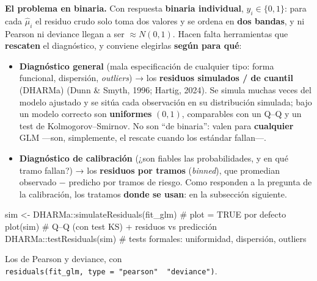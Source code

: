 \documentclass[
  letterpaper,
  DIV=11,
  numbers=noendperiod]{scrartcl}
\newenvironment{Shaded}{\begin{snugshade}}{\end{snugshade}}
\newcommand{\CommentTok}[1]{\textcolor[rgb]{0.37,0.37,0.37}{#1}}
\newcommand{\FunctionTok}[1]{\textcolor[rgb]{0.28,0.35,0.67}{#1}}
\newcommand{\NormalTok}[1]{\textcolor[rgb]{0.00,0.23,0.31}{#1}}
\newcommand{\OtherTok}[1]{\textcolor[rgb]{0.00,0.23,0.31}{#1}}
\newcommand{\SpecialCharTok}[1]{\textcolor[rgb]{0.37,0.37,0.37}{#1}}
\providecommand{\tightlist}{%
  \setlength{\itemsep}{0pt}\setlength{\parskip}{0pt}}\usepackage{longtable,booktabs,array}
\begin{document}
\textbf{El problema en binaria.} Con respuesta \textbf{binaria
individual}, \(y_i\in\{0,1\}\): para cada \(\hat\mu_i\) el residuo crudo
solo toma dos valores y se ordena en \textbf{dos bandas}, y ni Pearson
ni deviance llegan a ser \(\approx N(0,1)\). Hacen falta herramientas
que \textbf{rescaten} el diagnóstico, y conviene elegirlas \textbf{según
para qué}:

\begin{itemize}
\tightlist
\item
  \textbf{Diagnóstico general} (mala especificación de cualquier tipo:
  forma funcional, dispersión, \emph{outliers}) → los \textbf{residuos
  simulados / de cuantil} (DHARMa) (Dunn \& Smyth, 1996; Hartig, 2024).
  Se simula muchas veces del modelo ajustado y se sitúa cada observación
  en su distribución simulada; bajo un modelo correcto son
  \textbf{uniformes} \((0,1)\), comparables con un Q--Q y un test de
  Kolmogorov--Smirnov. No son ``de binaria'': valen para
  \textbf{cualquier} GLM ---son, simplemente, el rescate cuando los
  estándar fallan---.
\item
  \textbf{Diagnóstico de calibración} (¿son fiables las probabilidades,
  y en qué tramo fallan?) → los \textbf{residuos por tramos}
  (\emph{binned}), que promedian observado − predicho por tramos de
  riesgo. Como responden a la pregunta de la calibración, los tratamos
  \textbf{donde se usan}: en la subsección siguiente.
\end{itemize}

\begin{tcolorbox}[enhanced jigsaw, breakable, colframe=quarto-callout-tip-color-frame, left=2mm, arc=.35mm, colbacktitle=quarto-callout-tip-color!10!white, toprule=.15mm, colback=white, coltitle=black, rightrule=.15mm, opacitybacktitle=0.6, title=\textcolor{quarto-callout-tip-color}{\faLightbulb}\hspace{0.5em}{🔧 En R. Residuos simulados (DHARMa)}, titlerule=0mm, toptitle=1mm, bottomtitle=1mm, leftrule=.75mm, bottomrule=.15mm, opacityback=0]

\begin{Shaded}
\begin{Highlighting}[]
\NormalTok{sim }\OtherTok{\textless{}{-}}\NormalTok{ DHARMa}\SpecialCharTok{::}\FunctionTok{simulateResiduals}\NormalTok{(fit\_glm)   }\CommentTok{\# plot = TRUE por defecto}
\FunctionTok{plot}\NormalTok{(sim)                                   }\CommentTok{\# Q–Q (con test KS) + residuos vs predicción}
\NormalTok{DHARMa}\SpecialCharTok{::}\FunctionTok{testResiduals}\NormalTok{(sim)                  }\CommentTok{\# tests formales: uniformidad, dispersión, outliers}
\end{Highlighting}
\end{Shaded}

Los de Pearson y deviance, con
\texttt{residuals(fit\_glm,\ type\ =\ "pearson"\ \textbar{}\ "deviance")}.

\end{tcolorbox}
\end{document}
